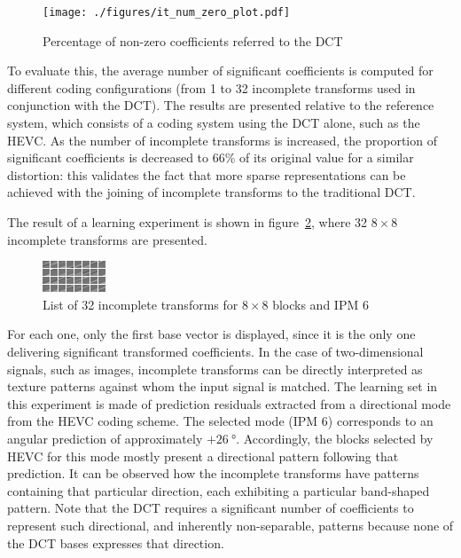 \documentclass[11pt,a4paper,openright,twoside]{book}
\def\usepdfs{1} %
\numberwithin{equation}{section} %
\numberwithin{figure}{section} %
\numberwithin{table}{section} %
\begin{document}
\begin{figure}[tp]
	\centering
	\ifthenelse{\usepdfs = 0}
	{}
	{\texttt{[image: ./figures/it\_num\_zero\_plot.pdf]}}
	\caption{Percentage of non-zero coefficients referred to the \acs{DCT}}
	\label{fig:it_num_zero}
\end{figure}

To evaluate this, the average number of significant coefficients is computed
for different coding configurations (from 1 to 32 incomplete transforms used
in conjunction with the \ac{DCT}).
The results are presented relative to the reference system, which consists of
a coding system using the \ac{DCT} alone, such as the \ac{HEVC}.
As the number of incomplete transforms is increased, the proportion of
significant coefficients is decreased to 66\% of its original value for a
similar distortion:
this validates the fact that more sparse representations can be achieved with
the joining of incomplete transforms to the traditional \ac{DCT}.

The result of a learning experiment is shown in
figure~\ref{fig:it_32_transforms}, where 32 $8\times8$ incomplete transforms
are presented.
\begin{figure}[tp]
	\centering
	\includegraphics[width=0.8\linewidth]{./figures/it_32_transforms.png}
	\caption{List of 32 incomplete transforms for $8\times8$ blocks and
	\acs{IPM} 6}
	\label{fig:it_32_transforms}
\end{figure}
For each one, only the first base vector is displayed, since it is the only
one delivering significant transformed coefficients.
In the case of two-dimensional signals, such as images, incomplete transforms can
be directly interpreted as texture patterns against whom the input signal is
matched.
The learning set in this experiment is made of prediction residuals extracted
from a directional mode from the \ac{HEVC} coding scheme.
The selected mode (\ac{IPM} 6) corresponds to an angular prediction of
approximately $+\SI{26}{\degree}$.
Accordingly, the blocks selected by \ac{HEVC} for this mode mostly present a
directional pattern following that prediction.
It can be observed how the incomplete transforms have patterns containing that
particular direction, each exhibiting a particular band-shaped pattern.
Note that the \ac{DCT} requires a significant number of coefficients to
represent such directional, and inherently non-separable, patterns because
none of the \ac{DCT} bases expresses that direction.
\end{document}
